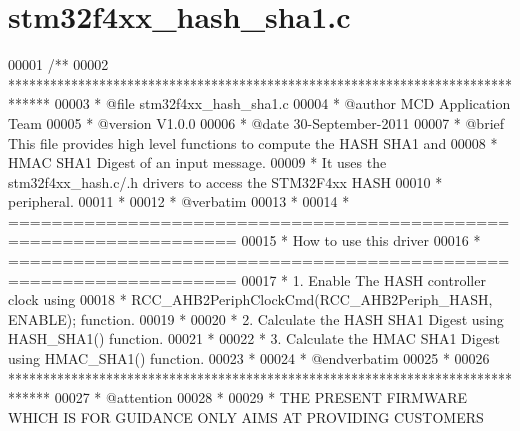 \section{stm32f4xx\+\_\+hash\+\_\+sha1.\+c}
\label{stm32f4xx__hash__sha1_8c_source}

\begin{DoxyCode}
00001 \textcolor{comment}{/**}
00002 \textcolor{comment}{  ******************************************************************************}
00003 \textcolor{comment}{  * @file    stm32f4xx\_hash\_sha1.c}
00004 \textcolor{comment}{  * @author  MCD Application Team}
00005 \textcolor{comment}{  * @version V1.0.0}
00006 \textcolor{comment}{  * @date    30-September-2011}
00007 \textcolor{comment}{  * @brief   This file provides high level functions to compute the HASH SHA1 and}
00008 \textcolor{comment}{  *          HMAC SHA1 Digest of an input message.}
00009 \textcolor{comment}{  *          It uses the stm32f4xx\_hash.c/.h drivers to access the STM32F4xx HASH}
00010 \textcolor{comment}{  *          peripheral.}
00011 \textcolor{comment}{  *}
00012 \textcolor{comment}{  *  @verbatim}
00013 \textcolor{comment}{  * }
00014 \textcolor{comment}{  *          ===================================================================}
00015 \textcolor{comment}{  *                                   How to use this driver}
00016 \textcolor{comment}{  *          ===================================================================}
00017 \textcolor{comment}{  *          1. Enable The HASH controller clock using }
00018 \textcolor{comment}{  *            RCC\_AHB2PeriphClockCmd(RCC\_AHB2Periph\_HASH, ENABLE); function.}
00019 \textcolor{comment}{  *}
00020 \textcolor{comment}{  *          2. Calculate the HASH SHA1 Digest using HASH\_SHA1() function.}
00021 \textcolor{comment}{  *}
00022 \textcolor{comment}{  *          3. Calculate the HMAC SHA1 Digest using HMAC\_SHA1() function.}
00023 \textcolor{comment}{  *}
00024 \textcolor{comment}{  *  @endverbatim}
00025 \textcolor{comment}{  *}
00026 \textcolor{comment}{  ******************************************************************************}
00027 \textcolor{comment}{  * @attention}
00028 \textcolor{comment}{  *}
00029 \textcolor{comment}{  * THE PRESENT FIRMWARE WHICH IS FOR GUIDANCE ONLY AIMS AT PROVIDING CUSTOMERS}

\end{DoxyCode}
